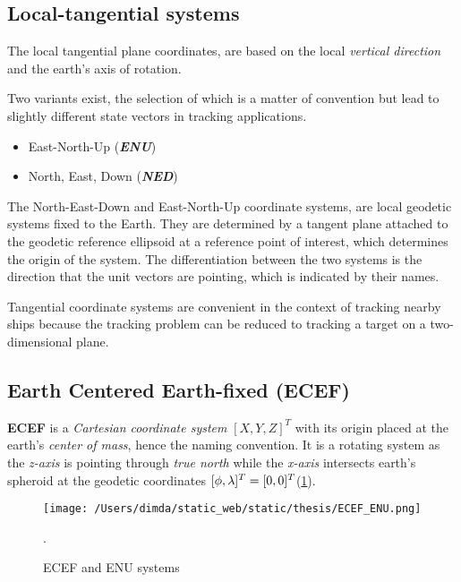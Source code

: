 \subsection{Local-tangential systems}

The local tangential plane coordinates, are based on the local \emph{vertical direction} and the earth's axis of rotation.

Two variants exist, the selection of which is a matter of convention but lead to slightly different state vectors in tracking applications.



\begin{itemize}
	\item East-North-Up (\textbf{\emph{ENU}})
	\item North, East, Down (\textbf{\emph{NED}})
\end{itemize}

The North-East-Down and East-North-Up coordinate systems, are local geodetic systems fixed to the Earth. They are determined by a tangent plane attached to the geodetic reference ellipsoid at a reference point of interest, which determines the origin of the system. The differentiation between the two systems is the direction that the unit vectors are pointing, which is indicated by their names.


Tangential coordinate systems are convenient in the context of tracking nearby ships because the tracking problem can be reduced to tracking a target on a two-dimensional plane.


\subsection{Earth Centered Earth-fixed (ECEF)}

\textbf{ECEF} is a \emph{Cartesian coordinate system} $[X,Y,Z]^T$ with its origin placed at the earth's \emph{center of mass}, hence the naming convention. It is a rotating system as the \emph{z-axis} is pointing through \emph{true north} while the \emph{x-axis} intersects earth's spheroid at the geodetic coordinates $[\phi,{\lambda}]^{T} =  [0,0]^{T}$(\cref{fig:ECEF_ENU}).


\begin{figure}[H]
	\centering
	\texttt{[image: /Users/dimda/static\_web/static/thesis/ECEF\_ENU.png]}
	\caption{ECEF and ENU systems \cite{WikipediaENUFig}}.
\label{fig:ECEF_ENU}
\end{figure}


